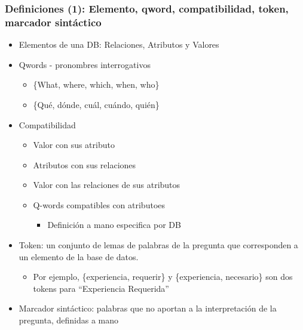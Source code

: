 \documentclass{beamer}
\begin{document}
\fontsize{9.5pt}{7.2}\selectfont
\begin{frame}
  \frametitle{Definiciones (1): Elemento, qword, compatibilidad, token, marcador sintáctico}
   \begin{itemize}
      \item Elementos de una DB: Relaciones, Atributos y Valores
      \item Qwords - pronombres interrogativos
      \begin{itemize}
          \item \{What, where, which, when, who\}
          \item \{Qué, dónde, cuál, cuándo, quién\}
      \end{itemize}
      \item Compatibilidad 
      \begin{itemize}
          \item Valor con sus atributo
          \item Atributos con sus relaciones
          \item Valor con las relaciones de sus atributos
          \item Q-words compatibles con atributoes
          \begin{itemize}
            \item Definición a mano especifica por DB
          \end{itemize}
      \end{itemize}
      \item Token: un conjunto de lemas de palabras de la pregunta que corresponden a un elemento de la base de datos.
      \begin{itemize}
            \item Por ejemplo, \{experiencia, requerir\} y \{experiencia, necesario\} son dos tokens para ``Experiencia Requerida''
      \end{itemize}
      \item Marcador sintáctico: palabras que no aportan a la interpretación de la pregunta, definidas a mano
    \end{itemize}
\end{frame}
\end{document}

